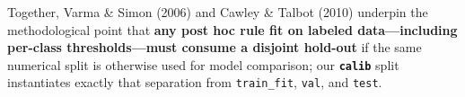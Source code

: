 \documentclass[
  11pt,
]{article}
\begin{document}
Together, Varma \& Simon (2006) and Cawley \& Talbot (2010) underpin the
methodological point that \textbf{any post hoc rule fit on labeled
data---including per-class thresholds---must consume a disjoint
hold-out} if the same numerical split is otherwise used for model
comparison; our \textbf{\texttt{calib}} split instantiates exactly that
separation from \texttt{train\_fit}, \texttt{val}, and \texttt{test}.
\end{document}
